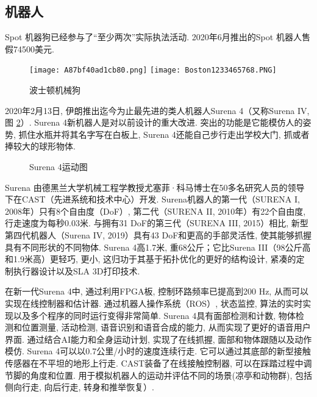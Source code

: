 \subsection{\textbf{机器人}}
Spot 机器狗已经参与了“至少两次”实际执法活动. 2020年6月推出的Spot 机器人售假74500美元.
\begin{figure}[H]
	\centering
	\texttt{[image: A87bf40ad1cb80.png]}
	\texttt{[image: Boston1233465768.PNG]}
	\caption{波士顿机械狗}
   \label{AI:7bf40ad1cb80Fig4}
\end{figure}

2020年2月13日, 伊朗推出迄今为止最先进的类人机器人Surena 4（又称Surena IV, 图 \ref{SurenaIVFig2}）.
Surena 4新机器人是对以前设计的重大改进. 突出的功能是它能模仿人的姿势, 抓住水瓶并将其名字写在白板上, Surena 4还能自己步行走出学校大门, 抓或者捧较大的球形物体.
\begin{figure}[H]
\centering
{}
\caption{Surena 4运动图}
\label{SurenaIVFig2}
\end{figure}
Surena 由德黑兰大学机械工程学教授尤塞菲·科马博士在50多名研究人员的领导下在CAST（先进系统和技术中心）开发.
Surena机器人的第一代（SURENA I, 2008年）只有8个自由度（DoF）, 第二代（SURENA II, 2010年）有22个自由度, 行走速度为每秒0.03米.
与拥有31 DoF的第三代（SURENA III, 2015）相比, 新型第四代机器人（Surena IV, 2019）具有43 DoF和更高的手部灵活性, 使其能够抓握具有不同形状的不同物体.
Surena 4高1.7米, 重68公斤；它比Surena III（98公斤高和1.9米高）更轻巧, 更小, 这归功于其基于拓扑优化的更好的结构设计, 紧凑的定制执行器设计以及SLA 3D打印技术.

在新一代Surena 4中, 通过利用FPGA板, 控制环路频率已提高到200 Hz, 从而可以实现在线控制器和估计器. 通过机器人操作系统（ROS）, 状态监控, 算法的实时实现以及多个程序的同时运行变得非常简单.
Surena 4具有面部检测和计数, 物体检测和位置测量, 活动检测, 语音识别和语音合成的能力, 从而实现了更好的语音用户界面. 通过结合AI能力和全身运动计划, 实现了在线抓握, 面部和物体跟随以及动作模仿.
Surena 4可以以0.7公里/小时的速度连续行走. 它可以通过其底部的新型接触传感器在不平坦的地形上行走.
CAST装备了在线接触控制器, 可以在踩踏过程中调节脚的角度和位置.
用于模拟机器人的运动并评估不同的场景(凉亭和动物群), 包括侧向行走, 向后行走, 转身和推举恢复）.
